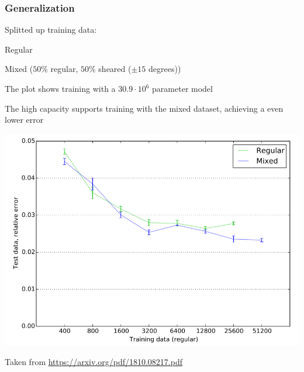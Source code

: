 \begin{frame}
    \frametitle{Generalization}
    \vspace*{0.8cm}
\begin{multicols}{2}
    Splitted up training data:
    \begin{PraesentationAufzaehlung}
		\item Regular
		\item Mixed ($50\%$ regular, $50\%$ sheared ($\pm 15$ degrees))
	\end{PraesentationAufzaehlung}
	
	The plot shows training with a $30.9 \cdot 10^6$ parameter model
	
	The high capacity supports training with the mixed dataset, \newline
	achieving a even lower error
	
	 
	
    \vfill\columnbreak
	\includegraphics[width=\columnwidth, height=.6\textheight]{./Ressourcen/Praesentation/Bilder/generaliz_plot.png}
\end{multicols}
\vspace*{-1.4cm}
    Taken from \url{https://arxiv.org/pdf/1810.08217.pdf}
\end{frame}
\clearpage

